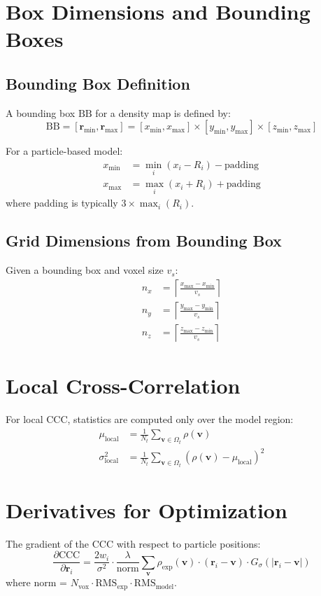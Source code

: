 \documentclass[12pt,a4paper]{article}
\begin{document}
\section{Box Dimensions and Bounding Boxes}

\subsection{Bounding Box Definition}
A bounding box $\text{BB}$ for a density map is defined by:
\begin{equation}
\text{BB} = [\mathbf{r}_{\min}, \mathbf{r}_{\max}] = [x_{\min}, x_{\max}] \times [y_{\min}, y_{\max}] \times [z_{\min}, z_{\max}]
\end{equation}

For a particle-based model:
\begin{align}
x_{\min} &= \min_i(x_i - R_i) - \text{padding} \\
x_{\max} &= \max_i(x_i + R_i) + \text{padding}
\end{align}
where padding is typically $3 \times \max_i(R_i)$.

\subsection{Grid Dimensions from Bounding Box}
Given a bounding box and voxel size $v_s$:
\begin{align}
n_x &= \left\lceil \frac{x_{\max} - x_{\min}}{v_s} \right\rceil \\
n_y &= \left\lceil \frac{y_{\max} - y_{\min}}{v_s} \right\rceil \\
n_z &= \left\lceil \frac{z_{\max} - z_{\min}}{v_s} \right\rceil
\end{align}

\section{Local Cross-Correlation}
For local CCC, statistics are computed only over the model region:
\begin{align}
\mu_{\text{local}} &= \frac{1}{N_t} \sum_{\mathbf{v} \in \Omega_t} \rho(\mathbf{v}) \\
\sigma_{\text{local}}^2 &= \frac{1}{N_t} \sum_{\mathbf{v} \in \Omega_t} (\rho(\mathbf{v}) - \mu_{\text{local}})^2
\end{align}

\section{Derivatives for Optimization}
The gradient of the CCC with respect to particle positions:
\begin{equation}
\frac{\partial \text{CCC}}{\partial \mathbf{r}_i} = \frac{2w_i}{\sigma^2} \cdot \frac{\lambda}{\text{norm}} \sum_{\mathbf{v}} \rho_{\text{exp}}(\mathbf{v}) \cdot (\mathbf{r}_i - \mathbf{v}) \cdot G_\sigma(|\mathbf{r}_i - \mathbf{v}|)
\end{equation}
where norm = $N_{\text{vox}} \cdot \text{RMS}_{\text{exp}} \cdot \text{RMS}_{\text{model}}$.
\end{document}
